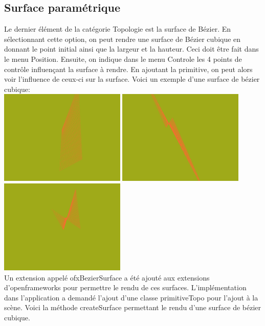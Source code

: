 \subsection{Surface paramétrique}
Le dernier élément de la catégorie Topologie est la surface de Bézier. En sélectionnant cette option, on peut rendre une surface de Bézier cubique en donnant le point initial ainsi que la largeur et la hauteur. Ceci doit être fait dans le menu Position. Ensuite, on indique dans le menu Controle les 4 points de contrôle influençant la surface à rendre. En ajoutant la primitive, on peut alors voir l'influence de ceux-ci sur la surface. Voici un exemple d'une surface de bézier cubique: \\
\includegraphics[width=6cm]{fig/surface1.png}
\includegraphics[width=6cm]{fig/surface2.png}
\includegraphics[width=6cm]{fig/surface3.png} \\
Un extension appelé ofxBezierSurface a été ajouté aux extensions d'openframeworks pour permettre le rendu de ces surfaces. L'implémentation dans l'application a demandé l'ajout d'une classe primitiveTopo pour l'ajout à la scène. Voici la méthode createSurface permettant le rendu d'une surface de bézier cubique.\\
